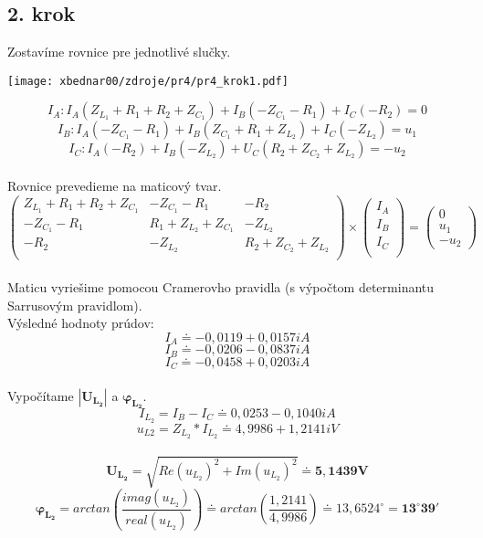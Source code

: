 \subsection*{2. krok}
Zostavíme rovnice pre jednotlivé slučky.
\begin{center}
\texttt{[image: xbednar00/zdroje/pr4/pr4\_krok1.pdf]}\\
\end{center}
$$I_A:I_A(Z_{L_1}+R_1+R_2+Z_{C_1})+I_B(-Z_{C_1}-R_1)+I_C(-R_2)=0$$
$$I_B:I_A(-Z_{C_1}-R_1)+I_B(Z_{C_1}+R_1+Z_{L_2})+I_C(-Z_{L_2})=u_1$$
$$I_C:I_A(-R_2)+I_B(-Z_{L_2})+U_C(R_2+Z_{C_2}+Z_{L_2})=-u_2$$\\
Rovnice prevedieme na maticový tvar.\\
$$\begin{pmatrix}
    Z_{L_1}+R_1+R_2+Z_{C_1} & -Z_{C_1}-R_1 & -R_2\\
    -Z_{C_1}-R_1 & R_1+Z_{L_2}+Z_{C_1} & -Z_{L_2}\\
    -R_2 & -Z_{L_2} & R_2+Z_{C_2}+Z_{L_2}\\
\end{pmatrix}
\times
\begin{pmatrix}
    I_A\\
    I_B\\
    I_C\\
\end{pmatrix}
=
\begin{pmatrix}
    0\\
    u_1\\
    -u_2
\end{pmatrix}$$\\
Maticu vyriešime pomocou Cramerovho pravidla (s výpočtom determinantu Sarrusovým pravidlom).\\
Výsledné hodnoty prúdov:\\
    $$I_A \doteq -0,0119 + 0,0157iA$$
    $$I_B \doteq -0,0206 - 0,0837iA$$
    $$I_C \doteq -0,0458 + 0,0203iA$$\\
Vypočítame $\pmb{|U_{L_2}|}$ a $\pmb{\varphi_{L_2}}$.\\
    $$I_{L_2} = I_B - I_C \doteq 0,0253 - 0,1040iA$$
    $$u_{L2} = Z_{L_2}*I_{L_2} \doteq 4,9986 + 1,2141iV$$\\
    $$\pmb{U_{L_2}} = \sqrt{{Re}(u_{L_2})^2 + {Im}(u_{L_2})^2} \doteq \pmb{5,1439V}$$
    $$\pmb{\varphi_{L_2}} = arctan\left(\frac{imag(u_{L_2})}{real(u_{L_2})}\right) \doteq arctan\left(\frac{1,2141}{4,9986}\right) \doteq 13,6524^{\circ} = \pmb{13^{\circ}39'}$$
    




